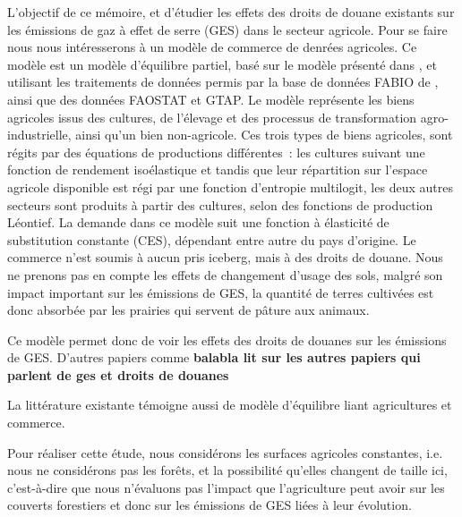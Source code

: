 
L'objectif de ce mémoire, et d'étudier les effets des droits de douane existants sur les émissions de gaz à effet de serre (GES) dans le secteur agricole. Pour se faire nous nous intéresserons à un modèle de commerce de denrées agricoles. Ce modèle est un modèle d'équilibre partiel, basé sur le modèle présenté dans \cite{Gouel2021}, et utilisant les traitements de données permis par la base de données FABIO de \cite{Bruckner2019}, ainsi que des données FAOSTAT et GTAP. Le modèle représente les biens agricoles issus des cultures, de l'élevage et des processus de transformation agro-industrielle, ainsi qu'un bien non-agricole. Ces trois types de biens agricoles, sont régits par des équations de productions différentes~: les cultures suivant une fonction de rendement isoélastique et tandis que leur répartition sur l'espace agricole disponible est régi par une fonction d'entropie multilogit, les deux autres secteurs sont produits à partir des cultures, selon des fonctions de production Léontief. La demande dans ce modèle suit une fonction à élasticité de substitution constante (CES), dépendant entre autre du pays d'origine. Le commerce n'est soumis à aucun pris iceberg, mais à des droits de douane. Nous ne prenons pas en compte les effets de changement d'usage des sols, malgré son impact important sur les émissions de GES, la quantité de terres cultivées est donc absorbée par les prairies qui servent de pâture aux animaux.

Ce modèle permet donc de voir les effets des droits de douanes sur les émissions de GES. D'autres papiers comme \textbf{balabla lit sur les autres papiers qui parlent de ges et droits de douanes}

La littérature existante témoigne aussi de modèle d'équilibre liant agricultures et commerce.






Pour réaliser cette étude, nous considérons les surfaces agricoles constantes, i.e. nous ne considérons pas les forêts, et la possibilité qu’elles changent de taille ici, c’est-à-dire que nous n’évaluons pas l’impact que l’agriculture peut avoir sur les couverts forestiers et donc sur les émissions de GES liées à leur évolution.

